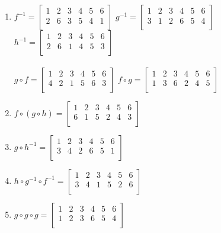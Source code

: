 \documentclass{article}
\begin{document}
\begin{enumerate}
    \item $f^{-1} = \begin{bmatrix}
        1 & 2 & 3 & 4 & 5 & 6 \\
        2 & 6 & 3 & 5 & 4 & 1 \\
    \end{bmatrix}$\quad
    $g^{-1} = \begin{bmatrix}
        1 & 2 & 3 & 4 & 5 & 6 \\
        3 & 1 & 2 & 6 & 5 & 4 \\
    \end{bmatrix}$\quad
    $h^{-1} = \begin{bmatrix}
        1 & 2 & 3 & 4 & 5 & 6 \\
        2 & 6 & 1 & 4 & 5 & 3 \\
    \end{bmatrix}$\\\\
    $g \circ f = \begin{bmatrix}
        1 & 2 & 3 & 4 & 5 & 6 \\
        4 & 2 & 1 & 5 & 6 & 3 \\
    \end{bmatrix}$\quad
    $f \circ g = \begin{bmatrix}
        1 & 2 & 3 & 4 & 5 & 6 \\
        1 & 3 & 6 & 2 & 4 & 5 \\
    \end{bmatrix}$

    \item $f \circ (g \circ h) = \begin{bmatrix}
        1 & 2 & 3 & 4 & 5 & 6 \\
        6 & 1 & 5 & 2 & 4 & 3 \\
    \end{bmatrix}$

    \item $g \circ h^{-1} = \begin{bmatrix}
        1 & 2 & 3 & 4 & 5 & 6 \\
        3 & 4 & 2 & 6 & 5 & 1 \\
    \end{bmatrix}$

    \item $h \circ g^{-1} \circ f^{-1} = \begin{bmatrix}
        1 & 2 & 3 & 4 & 5 & 6 \\
        3 & 4 & 1 & 5 & 2 & 6 \\
    \end{bmatrix}$

    \item $g \circ g \circ g = \begin{bmatrix}
        1 & 2 & 3 & 4 & 5 & 6 \\
        1 & 2 & 3 & 6 & 5 & 4 \\
    \end{bmatrix}$
\end{enumerate}
\end{document}
